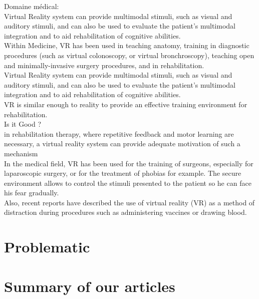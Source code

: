 \documentclass{article}
\begin{document}
Domaine médical: \\
Virtual Reality system can provide multimodal stimuli, such as visual and auditory stimuli, and can also be used to evaluate the patient’s multimodal integration and to aid rehabilitation of cognitive abilities. \\
Within Medicine, VR has been used in teaching anatomy, training in diagnostic procedures (such as virtual colonoscopy, or virtual bronchroscopy), teaching open and minimally-invasive surgery procedures, and in rehabilitation. \\
Virtual Reality system can provide multimodal stimuli, such as visual and auditory stimuli, and can also be used to evaluate the patient’s multimodal integration and to aid rehabilitation of cognitive abilities. \\

VR is similar enough to reality to provide an effective training environment for rehabilitation. \\


Is it Good ? \\
in rehabilitation therapy, where repetitive feedback and motor learning are necessary, a virtual reality system can provide adequate motivation of such a mechanism \\
In the medical field, VR has been used for the training of surgeons, especially for laparoscopic surgery, or for the treatment of phobias for example. The secure environment allows to control the stimuli presented to the patient so he can face his fear gradually. \\
Also, recent reports have described the use of virtual reality (VR) as a method of distraction during
procedures such as administering vaccines or drawing blood. \\


\section{Problematic}


\section{Summary of our articles}
\end{document}
